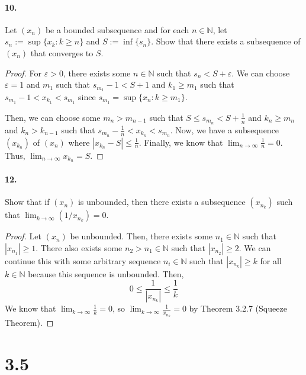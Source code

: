 \documentclass[12pt]{article}
\newcommand\N{\mathbb{N}}
\theoremstyle{remark}
\begin{document}
\paragraph{10.} Let $(x_n)$ be a bounded subsequence and for each $n \in \N$, let $s_n := \sup\{x_k : k \geq n\}$ and $S := \inf\{s_n\}$. Show that there exists a subsequence of $(x_n)$ that converges to $S$.
\begin{proof}
    For $\varepsilon > 0$, there exists some $n \in \N$ such that $s_n < S + \varepsilon$. We can choose $\varepsilon = 1$ and $m_1$ such that $s_{m_1} - 1 < S + 1$ and $k_1 \geq m_1$ such that $s_{m_1} - 1 < x_{k_1} < s_{m_1}$ since $s_{m_1} = \sup\{x_n : k \geq m_1\}$.

    Then, we can choose some $m_n > m_{n - 1}$ such that $S \leq s_{m_n} < S + \frac{1}{n}$ and $k_n \geq m_n$ and $k_n > k_{n - 1}$ such that $s_{m_n} - \frac{1}{n} < x_{k_n} < s_{m_n}$. Now, we have a subsequence $(x_{k_n})$ of $(x_n)$ where $|x_{k_n} - S| \leq \frac{1}{n}$. Finally, we know that $\lim_{n \to \infty} \frac{1}{n} = 0$. Thus, $\lim_{n \to \infty} x_{k_n} = S$.
\end{proof}

\paragraph{12.} Show that if $(x_n)$ is unbounded, then there exists a subsequence $(x_{n_k})$ such that $\lim_{k \to \infty} (1/x_{n_k}) = 0$.
\begin{proof}
    Let $(x_n)$ be unbounded. Then, there exists some $n_1 \in \N$ such that $|x_{n_1}| \geq 1$. There also exists some $n_2 > n_1 \in \N$ such that $|x_{n_2}| \geq 2$. We can continue this with some arbitrary sequence $n_i \in \N$ such that $|x_{n_k}| \geq k$ for all $k \in \N$ because this sequence is unbounded. Then, $$0 \leq \frac{1}{|x_{n_k}|} \leq \frac{1}{k}$$ We know that $\lim_{k \to \infty} \frac{1}{k} = 0$, so $\lim_{k \to \infty} \frac{1}{x_{n_k}} = 0$ by Theorem 3.2.7 (Squeeze Theorem).
\end{proof}

\section*{3.5}
\end{document}
